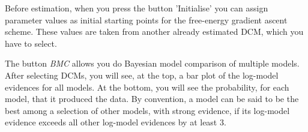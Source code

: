 Before estimation, when you press the button 'Initialise' you can
assign parameter values as initial starting points for the free-energy
gradient ascent scheme. These values are taken from another already
estimated DCM, which you have to select. 

The button \textit{BMC} allows you do Bayesian model comparison of
multiple models. After selecting DCMs, you will see, at the top, a
bar plot of the log-model evidences for all models. At the bottom, you
will see the probability, for each model, that it produced the
data. By convention, a model can be said to be the best among a
selection of other models, with strong evidence, if its log-model
evidence exceeds all other log-model evidences by at least 3. 
